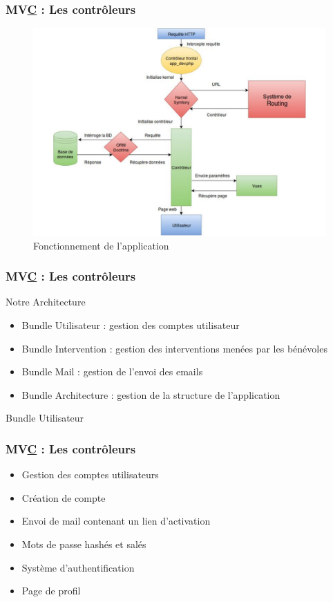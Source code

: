 
\begin{frame}
  \frametitle{MV\underline{C} : Les contrôleurs}
        \begin{figure}[!h]
	\begin{center}
	\includegraphics[scale=0.3]{images/symfony}
	\caption{Fonctionnement de l'application}
	\end{center}
\end{figure}
\end{frame}


\begin{frame}
  \frametitle{MV\underline{C} : Les contrôleurs}
  \begin{block}{Notre Architecture}
  \begin{itemize}
  \item Bundle Utilisateur : gestion des comptes utilisateur
  \item Bundle Intervention : gestion des interventions menées par les bénévoles
  \item Bundle Mail : gestion de l'envoi des emails
  \item Bundle Architecture : gestion de la structure de l'application
  \end{itemize}
  \end{block}   
  \end{frame}


\begin{frame}
\begin{block}{Bundle Utilisateur}
\frametitle{MV\underline{C} : Les contrôleurs}
\begin{itemize}
\item Gestion des comptes utilisateurs
\item Création de compte
\item Envoi de mail contenant un lien d'activation
\item Mots de passe hashés et salés
\item Système d'authentification
\item Page de profil 
\end{itemize}
\end{block}
\end{frame}

